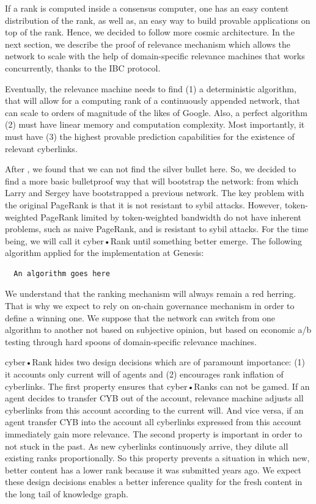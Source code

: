 \documentclass[8pt,oneside]{amsart}
\newcommand{\linkred}[2]{\href{#1}{\color{red}{#2}}}
\begin{document}
If a rank is computed inside a consensus computer, one has an easy content distribution of the rank, as well as, an easy way to build provable applications on top of the rank. Hence, we decided to follow more cosmic architecture. In the next section, we describe the proof of relevance mechanism which allows the network to scale with the help of domain-specific relevance machines that works concurrently, thanks to the IBC protocol.

Eventually, the relevance machine needs to find (1) a deterministic algorithm, that will allow for a computing rank of a continuously appended network, that can scale to orders of magnitude of the likes of Google. Also, a perfect algorithm (2) must have linear memory and computation complexity. Most importantly, it must have (3) the highest provable prediction capabilities for the existence of relevant cyberlinks.

After \linkred{https://arxiv.org/pdf/1709.09002.pdf}{some research}, we found that we can not find the silver bullet here. So, we decided to find a more basic bulletproof way that will bootstrap the network: \linkred{http://ilpubs.stanford.edu:8090/422/1/1999-66.pdf}{the rank} from which Larry and Sergey have bootstrapped a previous network. The key problem with the original PageRank is that it is not resistant to sybil attacks. However, token-weighted PageRank limited by token-weighted bandwidth do not have inherent problems, such as naive PageRank, and is resistant to sybil attacks. For the time being, we will call it cyber•Rank until something better emerge. The following algorithm applied for the implementation at Genesis:

\begin{lstlisting}
  An algorithm goes here
\end{lstlisting}

We understand that the ranking mechanism will always remain a red herring. That is why we expect to rely on on-chain governance mechanism in order to define a winning one. We suppose that the network can switch from one algorithm to another not based on subjective opinion, but based on economic a/b testing through hard spoons of domain-specific relevance machines.

cyber•Rank hides two design decisions which are of paramount importance: (1) it accounts only current will of agents and (2) encourages rank inflation of cyberlinks. The first property ensures that cyber•Ranks can not be gamed. If an agent decides to transfer CYB out of the account, relevance machine adjusts all cyberlinks from this account according to the current will. And vice versa, if an agent transfer CYB into the account all cyberlinks expressed from this account immediately gain more relevance. The second property is important in order to not stuck in the past. As new cyberlinks continuously arrive, they dilute all existing ranks proportionally. So this property prevents a situation in which new, better content has a lower rank because it was submitted years ago. We expect these design decisions enables a better inference quality for the fresh content in the long tail of knowledge graph.
\end{document}
